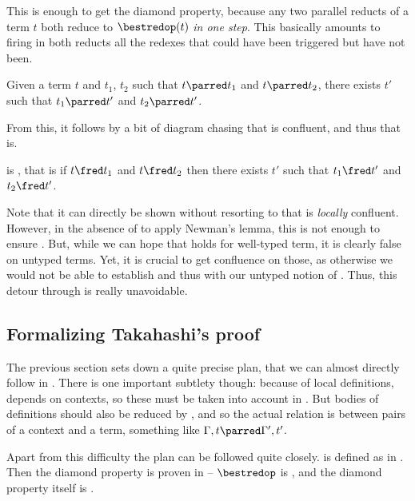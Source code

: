 This is enough to get the diamond property, because any two parallel reducts of a term $t$
both reduce to $\bestred{t}$ \emph{in one step}. This basically amounts to firing in both reducts
all the redexes that could have been triggered but have not been.

\begin{lemma}
  Given a term $t$ and $t_1$, $t_2$ such that $t \parred t_1$ and $t \parred t_2$, there exists
  $t'$ such that $t_1 \parred t'$ and $t_2 \parred t'$.
\end{lemma}

From this, it follows by a bit of diagram chasing that  is confluent,
and thus that  is.

\begin{theorem}
   is , that is if $t \red t_1$ and $t \red t_2$ then there exists
  $t'$ such that $t_1 \red t'$ and $t_2 \red t'$.
\end{theorem}

Note that it can directly be shown without resorting to  that 
is \emph{locally} confluent. However, in the absence of 
to apply Newman’s lemma, this
is not enough to ensure . But, while we can hope that  holds for
well-typed term, it is clearly false on untyped terms. Yet, it is crucial to get confluence on
those, as otherwise we would not be able to establish  and thus
 with our untyped notion of .
Thus, this detour through  is really unavoidable.

\subsection{Formalizing Takahashi’s proof}

The previous section sets down a quite precise plan, that we can almost directly follow in . There is one important subtlety though: because of local definitions, 
depends on contexts, so these must be taken into account in . But
bodies of definitions should also be reduced by ,
and so the actual relation is between pairs of a context and a term,
something like $\Gamma, t \parred \Gamma', t'$.

Apart from this difficulty%
%
the plan can be followed quite closely.
 is defined as  in
. Then the diamond property is proven in  – $\bestredop$ is ,
and the diamond property itself is .

